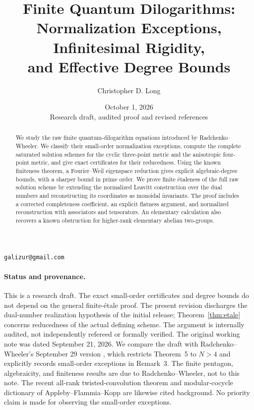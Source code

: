 \documentclass[11pt]{article}
\title{Finite Quantum Dilogarithms:\\Normalization Exceptions, Infinitesimal Rigidity,\\and Effective Degree Bounds}
\author{Christopher D. Long}
\date{October 1, 2026\\[2pt]\small Research draft, audited proof and revised references}
\theoremstyle{remark}
\begin{document}
\maketitle
\begin{center}\small\texttt{galizur@gmail.com}\end{center}
\begin{abstract}
We study the raw finite quantum-dilogarithm equations introduced by
Radchenko--Wheeler. We classify their small-order normalization exceptions,
compute the complete saturated solution schemes for the cyclic three-point
metric and the anisotropic four-point metric, and give exact certificates
for their reducedness. Using the known finiteness theorem, a Fourier--Weil
eigenspace reduction gives explicit algebraic-degree bounds, with a sharper
bound in prime order. We prove finite \'{e}taleness of the full raw solution
scheme by extending the normalized Leavitt construction over the dual
numbers and reconstructing its coordinates as monoidal invariants. The
proof includes a corrected completeness coefficient, an explicit flatness
argument, and normalized reconstruction with associators and tensorators.
An elementary calculation also recovers a known obstruction for higher-rank
elementary abelian two-groups.
\end{abstract}

\paragraph{Status and provenance.}
This is a research draft. The exact small-order certificates and degree bounds
do not depend on the general finite-\'{e}tale proof. The present revision
discharges the dual-number realization hypothesis of the initial release;
Theorem~\ref{thm:etale} concerns reducedness of the actual defining scheme.
The argument is internally audited, not independently refereed or formally verified. The original working note was dated
September 21, 2026. We compare the draft with Radchenko--Wheeler's
September 29 version \cite{RW2}, which restricts Theorem~5 to $N>4$ and
explicitly records small-order exceptions in Remark~3. The finite pentagon,
algebraicity, and finiteness results are due to Radchenko--Wheeler, not to
this note. The recent all-rank twisted-convolution theorem and modular-cocycle
dictionary of Appleby--Flammia--Kopp \cite{AFK} are likewise cited background.
No priority claim is made for observing the small-order exceptions.
\end{document}
